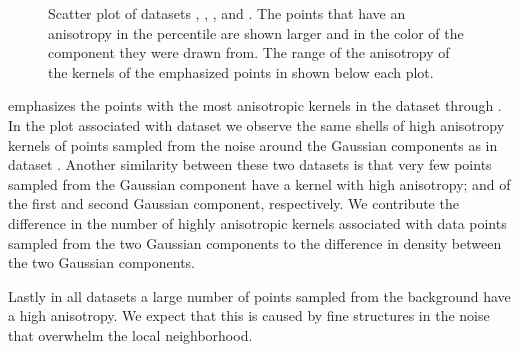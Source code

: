 \begin{figure}
\begin{subfigure}{0.23\textwidth}
					\caption{}
					\label{fig:discussion:anisotropy:baakman3}
				\end{subfigure}			
				\caption{Scatter plot of datasets
					 \ferdosiTwo, %
					 \baakmanTwo, %
					 \ferdosiThree, and %
					 \baakmanThree. %
					The points that have an anisotropy in the  percentile are shown larger and in the color of the component they were drawn from. The range of the anisotropy of the kernels of the emphasized points in shown below each plot.}
				\label{fig:discussion:anisotropy:multisphere}
			\end{figure}			
			 emphasizes the points with the most anisotropic kernels in the dataset \ferdosiTwo through \baakmanThree. 
				In the plot associated with dataset \ferdosiTwo we observe the same shells of high anisotropy kernels of points sampled from the noise around the Gaussian components as in dataset \ferdosiOne. Another similarity between these two datasets is that very few points sampled from the Gaussian component have a kernel with high anisotropy;  and  of the first and second Gaussian component, respectively. 
				We contribute the difference in the number of highly anisotropic kernels associated with data points sampled from the two Gaussian components to the difference in density between the two Gaussian components.








		Lastly in all datasets a large number of points sampled from the background have a high anisotropy. We expect that this is caused by fine structures in the noise that overwhelm the local neighborhood.



